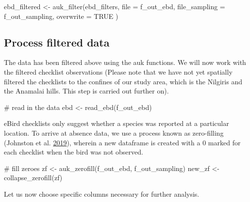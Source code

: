\documentclass[]{article}
\newenvironment{Shaded}{}{}
\newcommand{\CommentTok}[1]{\textcolor[rgb]{0.00,0.50,0.00}{#1}}
\newcommand{\DataTypeTok}[1]{#1}
\newcommand{\KeywordTok}[1]{\textcolor[rgb]{0.00,0.00,1.00}{#1}}
\newcommand{\NormalTok}[1]{#1}
\newcommand{\OtherTok}[1]{\textcolor[rgb]{1.00,0.25,0.00}{#1}}
\newcommand{\StringTok}[1]{\textcolor[rgb]{0.00,0.50,0.50}{#1}}
\begin{document}
\begin{Shaded}
\begin{Highlighting}[numbers=left,,]
\NormalTok{ebd_filtered <-}\StringTok{ }\KeywordTok{auk_filter}\NormalTok{(ebd_filters,}
  \DataTypeTok{file =}\NormalTok{ f_out_ebd,}
  \DataTypeTok{file_sampling =}\NormalTok{ f_out_sampling, }\DataTypeTok{overwrite =} \OtherTok{TRUE}
\NormalTok{)}
\end{Highlighting}
\end{Shaded}

\hypertarget{process-filtered-data}{%
\subsection{Process filtered data}\label{process-filtered-data}}

The data has been filtered above using the auk functions. We will now work with the filtered checklist observations (Please note that we have not yet spatially filtered the checklists to the confines of our study area, which is the Nilgiris and the Anamalai hills. This step is carried out further on).

\begin{Shaded}
\begin{Highlighting}[numbers=left,,]
\CommentTok{# read in the data}
\NormalTok{ebd <-}\StringTok{ }\KeywordTok{read_ebd}\NormalTok{(f_out_ebd)}
\end{Highlighting}
\end{Shaded}

eBird checklists only suggest whether a species was reported at a particular location. To arrive at absence data, we use a process known as zero-filling (Johnston et al. \protect\hyperlink{ref-johnston2019a}{2019}), wherein a new dataframe is created with a 0 marked for each checklist when the bird was not observed.

\begin{Shaded}
\begin{Highlighting}[numbers=left,,]
\CommentTok{# fill zeroes}
\NormalTok{zf <-}\StringTok{ }\KeywordTok{auk_zerofill}\NormalTok{(f_out_ebd, f_out_sampling)}
\NormalTok{new_zf <-}\StringTok{ }\KeywordTok{collapse_zerofill}\NormalTok{(zf)}
\end{Highlighting}
\end{Shaded}

Let us now choose specific columns necessary for further analysis.
\end{document}
